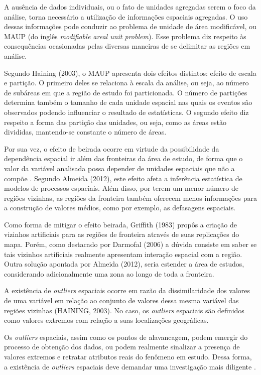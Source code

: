 \documentclass[12pt,a4paper]{article}
\begin{document}
A ausência de dados individuais, ou o fato de unidades agregadas serem o foco da análise, torna necessário a utilização de informações espaciais agregadas. O uso dessas informações pode conduzir ao problema de unidade de área modificável, ou MAUP (do inglês \textit{modifiable areal unit problem}). Esse problema diz respeito às consequências ocasionadas pelas diversas maneiras de se delimitar as regiões em análise. 
	
Segundo Haining (2003), o MAUP apresenta dois efeitos distintos: efeito de escala e partição. O primeiro deles se relaciona à escala da análise, ou seja, ao número de subáreas em que a região de estudo foi particionada. O número de partições determina também o tamanho de cada unidade espacial nas quais os eventos são observados podendo influenciar o resultado de estatísticas. O segundo efeito diz respeito a forma das partição das unidades, ou seja, como as  áreas estão divididas, mantendo-se constante o número de áreas.
	
Por sua vez, o efeito de beirada ocorre em virtude da possibilidade da dependência espacial ir além das fronteiras da área de estudo, de forma que o valor da variável analisada possa depender de unidades espaciais que não a compõe \cite{anselin88_g}. Segundo Almeida (2012), este efeito afeta a  inferência estatística de modelos de processos espaciais. Além disso, por terem um menor número de regiões vizinhas, as regiões da fronteira também oferecem menos informações para a construção de valores médios, como por exemplo, as defasagens espaciais.
	
Como forma de mitigar o efeito beirada, Griffith (1983) propôs a criação de vizinhos artificiais para as regiões de fronteira através de suas replicações do mapa. Porém, como destacado por Darmofal (2006) a dúvida consiste em saber se tais vizinhos artificiais realmente apresentam interação espacial com a região. Outra solução apontada por Almeida (2012), seria estender a área de estudos, considerando adicionalmente uma zona ao longo de toda a fronteira.
	
A existência de \textit{outliers} espaciais ocorre em razão da dissimilaridade dos valores de uma variável em relação ao conjunto de valores dessa mesma variável das regiões vizinhas (HAINING, 2003). No caso, os \textit{outliers} espaciais são definidos como valores extremos com relação a suas localizações geográficas. 

Os \textit{outliers} espaciais, assim como os pontos de alavancagem, podem emergir do processo de obtenção dos dados, ou podem realmente sinalizar a presença de valores extremos e retratar atributos reais do fenômeno em estudo. Dessa forma, a existência de \textit{outliers} espaciais deve demandar uma investigação mais diligente \cite{almeida12_g}.
	
\end{document}
